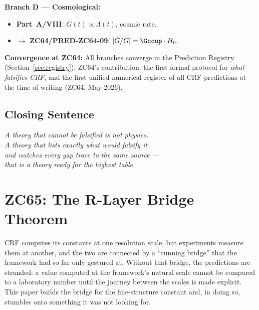 \documentclass[12pt, a4paper]{article}
\begin{document}
\begin{genealogybox}[title={How ZC64's Key Objects Trace Back}]
\textbf{Branch D --- Cosmological:}
\begin{itemize}[leftmargin=2em, noitemsep]
  \item \textbf{Part~A/VIII}: $G(t)\propto\Lambda(t)$, cosmic rate.
  \item $\to$ \textbf{ZC64/PRED-ZC64-09}: $|\dot{G}/G|=\Gcoup\cdot H_0$.
\end{itemize}

\textbf{Convergence at ZC64:}
All branches converge in the Prediction Registry
(Section~\ref{sec:registry}).
ZC64's contribution: the first formal protocol for
\emph{what falsifies CRF}, and the first unified
numerical register of all CRF predictions at the
time of writing (ZC64, May 2026).
\end{genealogybox}

\subsection{Closing Sentence}

\bigskip
\begin{center}
\textit{A theory that cannot be falsified is not physics.\\
A theory that lists exactly what would falsify it\\
and watches every gap trace to the same source ---\\
that is a theory ready for the highest table.}
\end{center}



\section{ZC65: The R-Layer Bridge Theorem}

CRF computes its constants at one resolution scale, but experiments measure them
at another, and the two are connected by a ``running bridge'' that the framework
had so far only gestured at. Without that bridge, the predictions are stranded:
a value computed at the framework's natural scale cannot be compared to a
laboratory number until the journey between the scales is made explicit. This
paper builds the bridge for the fine-structure constant and, in doing so, stumbles
onto something it was not looking for.
\end{document}
